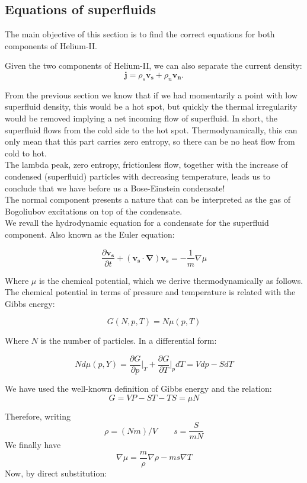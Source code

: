 \documentclass{article}
\begin{document}
\subsection{Equations of superfluids}

The main objective of this section is to find the correct equations for both components of Helium-II\@.

Given the two components of Helium-II, we can also separate the current density:
\[\mathbf{j} = \rho_s \mathbf{v_s}+\rho_n \mathbf{v_n}\text{.}\]

From the previous section we know that if we had momentarily a point with low superfluid density, this would be a hot spot, but quickly the thermal irregularity would be removed implying a net incoming flow of superfluid. In short, the superfluid flows from the cold side to the hot spot. Thermodynamically, this can only mean that this part carries zero entropy, so there can be no heat flow from cold to hot.
\\

The lambda peak, zero entropy, frictionless flow, together with the increase of condensed (superfluid) particles with decreasing temperature, leads us to conclude that we have before us a Bose-Einstein condensate!
\\

The normal component presents a nature that can be interpreted as the gas of Bogoliubov excitations on top of the condensate.
\\

We revall the hydrodynamic equation for a condensate for the superfluid component. Also known as the Euler equation: 

\[\frac{\partial \mathbf{v_s}}{\partial t} + (\mathbf{v_s}\cdot \mathbf{\nabla})\mathbf{v_s} = -\frac{1}{m}\nabla \mu\]

Where $\mu$ is the chemical potential, which we derive thermodynamically as follows. The chemical potential in terms of pressure and temperature is related with the Gibbs energy:

\[G(N, p, T)= N \mu(p, T)\]

Where $N$ is the number of particles. In a differential form:

\[N d\mu(p, Y) = \frac{\partial G}{\partial p} \bigg|_T + \frac{\partial G}{\partial T}\bigg|_p dT = Vdp - S dT\]

We have used the well-known definition of Gibbs energy and the relation:
\[G = VP - ST - TS = \mu N\]

Therefore, writing 
\[\rho = (Nm)/V \qquad s = \frac{S}{mN}\]
We finally have
\[\nabla \mu = \frac{m}{\rho} \nabla \rho - m s \nabla T\]
Now, by direct substitution:
\end{document}
